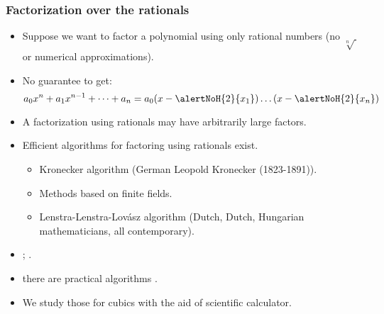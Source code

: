 \begin{frame}
\frametitle{Factorization over the rationals}
\begin{itemize}
\item Suppose we want to factor a polynomial using only rational numbers (no $\sqrt[n]{~}$ or numerical approximations).
\item<2-> No guarantee to get:
\[
a_0 x^{n}+a_1x^{n-1}+\dots + a_n=a_0 (x- \alertNoH{2}{x_1} )\dots (x-\alertNoH{2}{ x_n} )
\]
\item<3-> A factorization using rationals may have arbitrarily large factors.
\item<4-> Efficient algorithms for factoring using rationals exist.
\begin{itemize}
\item<5-> Kronecker algorithm (German Leopold Kronecker (1823-1891)).
\item<6-> Methods based on finite fields.
\item<7-> Lenstra-Lenstra-Lov\'{a}sz algorithm (Dutch, Dutch, Hungarian mathematicians, all contemporary). 
\end{itemize}
\item<8-> ; .
\item<9->  there are practical algorithms .
\item<10-> We study those for cubics with the aid of scientific calculator.
\end{itemize}
\end{frame}